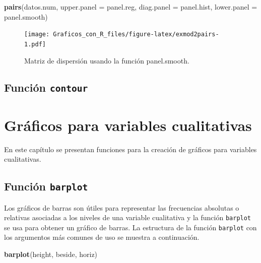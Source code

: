 \documentclass[10pt,]{krantz}
\makeatletter
\newenvironment{Shaded}{\begin{snugshade}}{\end{snugshade}}
\newcommand{\KeywordTok}[1]{\textcolor[rgb]{0.13,0.29,0.53}{\textbf{{#1}}}}
\newcommand{\DataTypeTok}[1]{\textcolor[rgb]{0.13,0.29,0.53}{{#1}}}
\newcommand{\NormalTok}[1]{{#1}}
\newenvironment{kframe}{%
\medskip{}
\setlength{\fboxsep}{.8em}
 \def\at@end@of@kframe{}%
 \ifinner\ifhmode%
  \def\at@end@of@kframe{\end{minipage}}%
  \begin{minipage}{\columnwidth}%
 \fi\fi%
 \def\FrameCommand##1{\hskip\@totalleftmargin \hskip-\fboxsep
 \colorbox{shadecolor}{##1}\hskip-\fboxsep
     \hskip-\linewidth \hskip-\@totalleftmargin \hskip\columnwidth}%
 \MakeFramed {\advance\hsize-\width
   \@totalleftmargin\z@ \linewidth\hsize
   \@setminipage}}%
 {\par\unskip\endMakeFramed%
 \at@end@of@kframe}
\renewenvironment{Shaded}{\begin{kframe}}{\end{kframe}}
\makeatother
\begin{document}
\begin{Shaded}
\begin{Highlighting}[]
\KeywordTok{pairs}\NormalTok{(datos.num,}
      \DataTypeTok{upper.panel =} \NormalTok{panel.reg,}
      \DataTypeTok{diag.panel =} \NormalTok{panel.hist,}
      \DataTypeTok{lower.panel =} \NormalTok{panel.smooth)}
\end{Highlighting}
\end{Shaded}

\begin{figure}[htbp]
\centering
\texttt{[image: Graficos\_con\_R\_files/figure-latex/exmod2pairs-1.pdf]}
\caption{\label{fig:exmod2pairs}Matriz de dispersión usando la función
panel.smooth.}
\end{figure}

\section{\texorpdfstring{Función \texttt{contour} 
}{Función contour  }}\label{funcion-contour}

\chapter{Gráficos para variables
cualitativas}\label{graficos-para-variables-cualitativas}

En este capítulo se presentan funciones para la creación de gráficos
para variables cualitativas.

\section{\texorpdfstring{Función \texttt{barplot}
}{Función barplot  }}\label{funcion-barplot}

Los gráficos de barras son útiles para representar las frecuencias
absolutas o relativas asociadas a los niveles de una variable
cualitativa y la función \texttt{barplot} se usa para obtener un gráfico
de barras. La estructura de la función \texttt{barplot} con los
argumentos más comunes de uso se muestra a continuación.

\begin{Shaded}
\begin{Highlighting}[]
\KeywordTok{barplot}\NormalTok{(height, beside, horiz)}
\end{Highlighting}
\end{Shaded}
\end{document}
